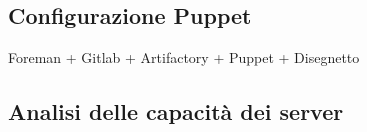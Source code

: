 \subsection{Configurazione Puppet}
Foreman + Gitlab + Artifactory + Puppet + Disegnetto
\subsection{Analisi delle capacità dei server}